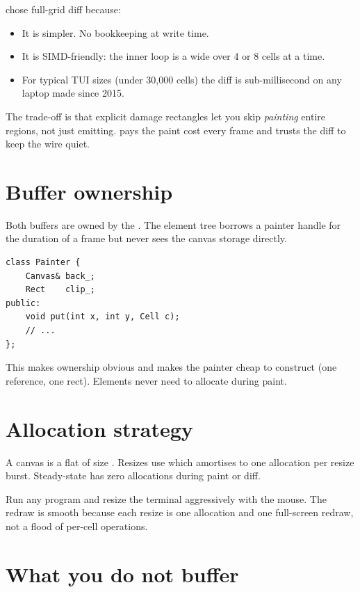 \maya{} chose full-grid diff because:

\begin{itemize}[leftmargin=*]
  \item It is simpler. No bookkeeping at write time.
  \item It is SIMD-friendly: the inner loop is a wide
     over 4 or 8 cells at a time.
  \item For typical TUI sizes (under 30,000 cells) the diff is
    sub-millisecond on any laptop made since 2015.
\end{itemize}

The trade-off is that explicit damage rectangles let you skip
\emph{painting} entire regions, not just emitting. \maya{} pays
the paint cost every frame and trusts the diff to keep the wire
quiet.

\section{Buffer ownership}

Both buffers are owned by the . The element tree
borrows a painter handle for the duration of a frame but never
sees the canvas storage directly.

\begin{lstlisting}
class Painter {
    Canvas& back_;
    Rect    clip_;
public:
    void put(int x, int y, Cell c);
    // ...
};
\end{lstlisting}

This makes ownership obvious and makes the painter cheap to
construct (one reference, one rect). Elements never need to
allocate during paint.

\section{Allocation strategy}

A canvas is a flat  of size
. Resizes use  which
amortises to one allocation per resize burst. Steady-state has
zero allocations during paint or diff.

\begin{tryit}
Run any \maya{} program and resize the terminal aggressively
with the mouse. The redraw is smooth because each resize is
one allocation and one full-screen redraw, not a flood of
per-cell operations.
\end{tryit}

\section{What you do not buffer}

